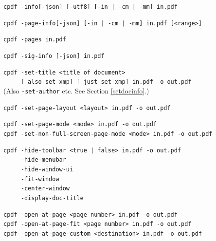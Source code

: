 \documentclass{book}
\begin{document}
  \begin{framed}

    \small\noindent\verb!cpdf -info[-json] [-utf8] [-in | -cm | -mm] in.pdf!

    \vspace{1.5mm}
    \small\noindent\verb!cpdf -page-info[-json] [-in | -cm | -mm] in.pdf [<range>]!

    \vspace{1.5mm}
    \small\noindent\verb!cpdf -pages in.pdf!

    \vspace{1.5mm}
    \small\noindent\verb!cpdf -sig-info [-json] in.pdf!

    \vspace{1.5mm}
    \small\noindent\verb!cpdf -set-title <title of document>!\\
    \small\noindent\verb!     [-also-set-xmp] [-just-set-xmp] in.pdf -o out.pdf!\\
    (Also \texttt{-set-author} etc. See Section \ref{setdocinfo}.)

    \vspace{1.5mm}
    \small\noindent\verb!cpdf -set-page-layout <layout> in.pdf -o out.pdf!

    \vspace{1.5mm}
    \small\noindent\verb!cpdf -set-page-mode <mode> in.pdf -o out.pdf!\\
    \small\noindent\verb!cpdf -set-non-full-screen-page-mode <mode> in.pdf -o out.pdf!



    \vspace{1.5mm} 
    \small\noindent\verb!cpdf -hide-toolbar <true | false> in.pdf -o out.pdf!\\
    \noindent\verb!     -hide-menubar!\\
    \noindent\verb!     -hide-window-ui!\\
    \noindent\verb!     -fit-window!\\
    \noindent\verb!     -center-window!\\
    \noindent\verb!     -display-doc-title!
    
    \vspace{1.5mm}
    \small\noindent\verb!cpdf -open-at-page <page number> in.pdf -o out.pdf!\\
    \noindent\verb!cpdf -open-at-page-fit <page number> in.pdf -o out.pdf!\\
    \noindent\verb!cpdf -open-at-page-custom <destination> in.pdf -o out.pdf!


\end{framed}
\end{document}

